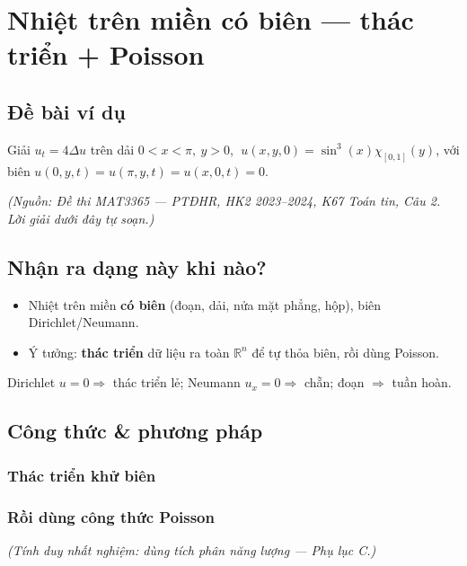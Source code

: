 
\section{Nhiệt trên miền có biên --- thác triển + Poisson}

\subsection*{Đề bài ví dụ}
Giải $u_t=4\Delta u$ trên dải $0<x<\pi,\ y>0$, $\;u(x,y,0)=\sin^3(x)\chi_{[0,1]}(y)$,
với biên $u(0,y,t)=u(\pi,y,t)=u(x,0,t)=0$.

\emph{\small(Nguồn: Đề thi MAT3365 --- PTĐHR, HK2 2023--2024, K67 Toán tin, Câu 2. Lời giải dưới đây tự soạn.)}

\subsection*{Nhận ra dạng này khi nào?}
\begin{itemize}
  \item Nhiệt trên miền \textbf{có biên} (đoạn, dải, nửa mặt phẳng, hộp), biên Dirichlet/Neumann.
  \item Ý tưởng: \textbf{thác triển} dữ liệu ra toàn $\mathbb{R}^n$ để tự thỏa biên, rồi dùng Poisson.
\end{itemize}
\begin{meobox}
Dirichlet $u=0\Rightarrow$ thác triển lẻ; Neumann $u_x=0\Rightarrow$ chẵn; đoạn $\Rightarrow$ tuần hoàn.
\end{meobox}

\subsection*{Công thức \& phương pháp}
\subsubsection*{Thác triển khử biên}

\subsubsection*{Rồi dùng công thức Poisson}

\emph{(Tính duy nhất nghiệm: dùng tích phân năng lượng --- Phụ lục C.)}


